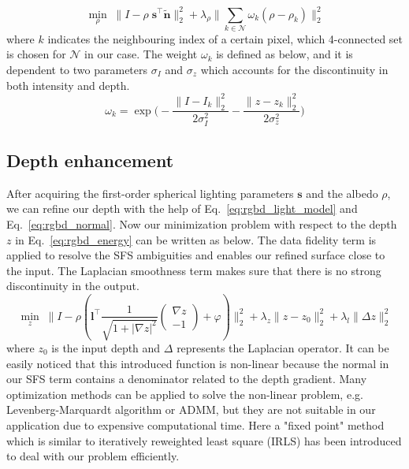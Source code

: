 \begin{equation}\label{eq:rgbd_albedo_estimate}
	\min_{\rho} \; \lVert I - \rho \; \mathbf{s}^\top \tilde{\mathbf{n}} \rVert^2_2 + \lambda_{\rho} \lVert \sum_{k \in \mathcal{N}} \omega_k (\rho - \rho_k) \rVert^2_2
\end{equation}
where $k$ indicates the neighbouring index of a certain pixel, which 4-connected set is chosen for $\mathcal{N}$ in our case. 
The weight $\omega_k$ is defined as below, and it is dependent to two parameters $\sigma_I$ and $\sigma_z$ which accounts for the discontinuity in both intensity and depth.
\begin{equation}
	\omega_k=\exp\Bigg(-\dfrac{\lVert I - I_k \rVert^2_2}{2\sigma_I^2} -\dfrac{\lVert z - z_k \rVert^2_2}{2\sigma_z^2}\Bigg)
\end{equation}

\subsection{Depth enhancement}
After acquiring the first-order spherical lighting parameters $\mathbf{s}$ and the albedo $\rho$, we can refine our depth with the help of Eq.~\ref{eq:rgbd_light_model} and Eq.~\ref{eq:rgbd_normal}.
Now our minimization problem with respect to the depth $z$ in Eq.~\ref{eq:rgbd_energy} can be written as below. 
The data fidelity term is applied to resolve the SFS ambiguities and enables our refined surface close to the input. The Laplacian smoothness term makes sure that there is no strong discontinuity in the output. 
\begin{equation}\label{eq:rgbd_depth_refine}
	\min_{z} \; \lVert I - \rho (\mathbf{l}^\top \frac{1}{\sqrt{1 + |\nabla z|^2}} \begin{pmatrix} \nabla z\\ -1 \end{pmatrix} + \varphi) \rVert^2_2 + \lambda_z \lVert z - z_0\rVert^2_2 + \lambda_l \lVert \Delta z \rVert^2_2
\end{equation}
where $z_0$ is the input depth and $\Delta$ represents the  Laplacian operator. 
It can be easily noticed that this introduced function is non-linear because the normal in our SFS term contains a denominator related to the depth gradient. 
Many optimization methods can be applied to solve the non-linear problem, e.g. Levenberg-Marquardt algorithm or ADMM, but they are not suitable in our application due to expensive computational time. 
Here a "fixed point" method which is similar to iteratively reweighted least square (IRLS) has been introduced to deal with our problem efficiently. 

